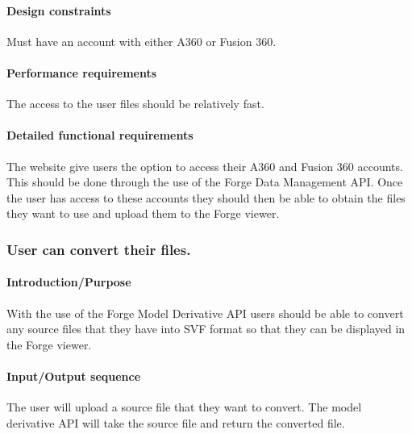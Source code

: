 \documentclass[letterpaper, 10pt, draftclsnofoot, compsoc, onecolumn]{IEEEtran}
\begin{document}
\paragraph[Design constraints]{\rmfamily\bfseries\color{black} Design
constraints }
{\color{black}
	Must have an account with either A360 or Fusion 360. 
}

\paragraph[Performance requirements]{\rmfamily\bfseries\color{black}
Performance requirements }
{\color{black}
	The access to the user files should be relatively  fast.
}

\paragraph[Detailed functional requirements]{\rmfamily\bfseries\color{black}
Detailed functional requirements }
{\color{black}
	The website give users the option to access their A360 and Fusion 360 accounts. This should be done through
	the use of the Forge Data Management API. Once the user has access to these accounts they should then be 
	able to obtain the files they want to use and upload them to the Forge viewer.
}


\subsubsection[{Model Derivative}]{\rmfamily\bfseries\color{black} \rmfamily\bfseries\color{black}  
	User can convert their files.
}
\smallskip
\paragraph[Introduction/Purpose of this
feature]{\rmfamily\bfseries\color{black}
Introduction/Purpose }
{\color{black}
	With the use of the Forge Model Derivative API users should be able to convert any source files that they have into SVF format
	so that they can be displayed in the Forge viewer.
}

\paragraph[Input/Output sequence]{\rmfamily\bfseries\color{black}
Input/Output sequence }
{\color{black}
	The user will upload a source file that they want to convert. The model derivative API will take the source file and return the 
	converted file.
}
\end{document}
